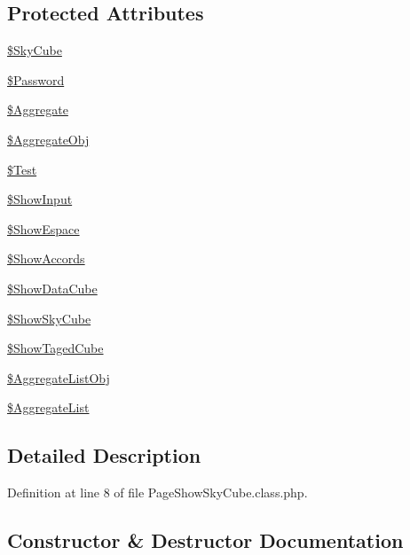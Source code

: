 \subsection*{Protected Attributes}
\begin{DoxyCompactItemize}
\item 
\hyperlink{class_page_show_sky_cube_adf8c15b4d2224482074d484fc5681491}{\$\+Sky\+Cube}
\item 
\hyperlink{class_page_show_sky_cube_a6719d7a8ec2d5a44eb4c6aceec7a559b}{\$\+Password}
\item 
\hyperlink{class_page_show_sky_cube_ad135bdae01fcdbeb9752c5620c94120c}{\$\+Aggregate}
\item 
\hyperlink{class_page_show_sky_cube_a23eebb27d93a07a864b1879eb52351f5}{\$\+Aggregate\+Obj}
\item 
\hyperlink{class_page_show_sky_cube_a730910d83242e48409868e4939e83fdf}{\$\+Test}
\item 
\hyperlink{class_page_show_sky_cube_a5f0404d693072ef9d2f35dee396f5b68}{\$\+Show\+Input}
\item 
\hyperlink{class_page_show_sky_cube_a3a856b5cd82288038b4f64e36a57cb8d}{\$\+Show\+Espace}
\item 
\hyperlink{class_page_show_sky_cube_a20ef27bd4b78794edcfa9beaad7060f6}{\$\+Show\+Accords}
\item 
\hyperlink{class_page_show_sky_cube_a72211ee8473a6d1ed6d1a9fceec82235}{\$\+Show\+Data\+Cube}
\item 
\hyperlink{class_page_show_sky_cube_aaa2e130a0a531fddedb6ebddc89e396a}{\$\+Show\+Sky\+Cube}
\item 
\hyperlink{class_page_show_sky_cube_aa7fc35a490126814523ff0f8fdd7cae0}{\$\+Show\+Taged\+Cube}
\item 
\hyperlink{class_page_show_sky_cube_aaf56d4c8424418a8ae37f8d97f52a39c}{\$\+Aggregate\+List\+Obj}
\item 
\hyperlink{class_page_show_sky_cube_a1b722a7ea1450ce80730be858f06dbb2}{\$\+Aggregate\+List}
\end{DoxyCompactItemize}


\subsection{Detailed Description}


Definition at line 8 of file Page\+Show\+Sky\+Cube.\+class.\+php.



\subsection{Constructor \& Destructor Documentation}
\mbox{\label{class_page_show_sky_cube_a176fc261000e1b893944233c97f1677a}} 
